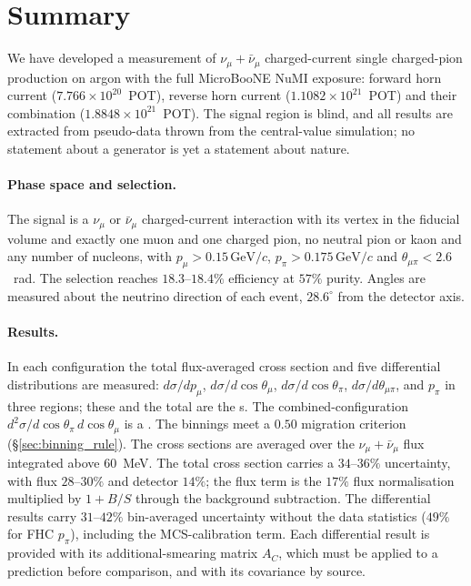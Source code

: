 \documentclass[11pt,a4paper]{article}
\newcommand{\uboone}{MicroBooNE}
\newcommand{\GeVc}{\,\text{GeV}\!/c}
\begin{document}
\section{Summary}
\label{sec:summary}

We have developed a measurement of $\nu_\mu+\bar\nu_\mu$ charged-current single charged-pion
production on argon with the full \uboone{} NuMI exposure: forward horn current
($7.766\times10^{20}$~POT), reverse horn current ($1.1082\times10^{21}$~POT) and their combination
($1.8848\times10^{21}$~POT). The signal region is blind, and all results are extracted from pseudo-data
thrown from the central-value simulation; no statement about a generator is yet a statement about
nature.

\paragraph{Phase space and selection.}
The signal is a $\nu_\mu$ or $\bar\nu_\mu$ charged-current interaction with its vertex in the fiducial
volume and exactly one muon and one charged pion, no neutral pion or kaon and any number of nucleons,
with $p_\mu>0.15\GeVc$, $p_\pi>0.175\GeVc$ and $\theta_{\mu\pi}<2.6$~rad. The selection reaches
$18.3$--$18.4\%$ efficiency at $57\%$ purity. Angles are measured about the neutrino direction of each
event, $28.6^\circ$ from the detector axis.

\paragraph{Results.}
In each configuration the total flux-averaged cross section and five differential distributions are
measured: $d\sigma/dp_\mu$, $d\sigma/d\cos\theta_\mu$, $d\sigma/d\cos\theta_\pi$,
$d\sigma/d\theta_{\mu\pi}$, and $p_\pi$ in three regions; these and the total are the
\statPrimary{}s. The combined-configuration $d^2\sigma/d\cos\theta_\pi\,d\cos\theta_\mu$ is a
\statSecondary{}. The binnings meet a $0.50$ migration criterion (\S\ref{sec:binning_rule}). The
cross sections are averaged over the $\nu_\mu+\bar\nu_\mu$ flux integrated above $60$~MeV. The total
cross section carries a $34$--$36\%$ uncertainty, with flux $28$--$30\%$ and detector $14\%$; the
flux term is the $17\%$ flux normalisation multiplied by $1+B/S$ through the background subtraction.
The differential results carry $31$--$42\%$ bin-averaged uncertainty without the data statistics
($49\%$ for FHC $p_\pi$), including the MCS-calibration term. Each differential result is provided
with its additional-smearing matrix $A_C$, which must be applied to a prediction before comparison,
and with its covariance by source.
\end{document}
